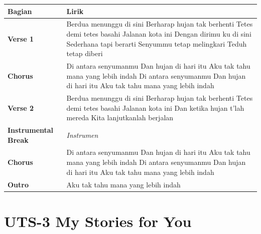 \documentclass[
  letterpaper,
  DIV=11,
  numbers=noendperiod]{scrreprt}
\begin{document}
\begin{longtable}[]{@{}
  >{\raggedright\arraybackslash}p{}
  >{\raggedright\arraybackslash}p{}@{}}
\toprule\noalign{}
\begin{minipage}[b]{\linewidth}\raggedright
Bagian
\end{minipage} & \begin{minipage}[b]{\linewidth}\raggedright
Lirik
\end{minipage} \\
\midrule\noalign{}
\endhead
\bottomrule\noalign{}
\endlastfoot
\textbf{Verse 1} & Berdua menunggu di sini Berharap hujan tak berhenti
Tetes demi tetes basahi Jalanan kota ini Dengan dirimu ku di sini
Sederhana tapi berarti Senyummu tetap melingkari Teduh tetap diberi \\
\textbf{Chorus} & Di antara senyumanmu Dan hujan di hari itu Aku tak
tahu mana yang lebih indah Di antara senyumanmu Dan hujan di hari itu
Aku tak tahu mana yang lebih indah \\
\textbf{Verse 2} & Berdua menunggu di sini Berharap hujan tak berhenti
Tetes demi tetes basahi Jalanan kota ini Dan ketika hujan t'lah mereda
Kita lanjutkanlah berjalan \\
\textbf{Instrumental Break} & \emph{Instrumen} \\
\textbf{Chorus} & Di antara senyumanmu Dan hujan di hari itu Aku tak
tahu mana yang lebih indah Di antara senyumanmu Dan hujan di hari itu
Aku tak tahu mana yang lebih indah \\
\textbf{Outro} & Aku tak tahu mana yang lebih indah \\
\end{longtable}


\chapter{UTS-3 My Stories for You}\label{uts-3-my-stories-for-you}
\end{document}
